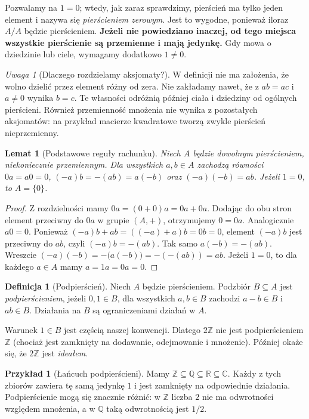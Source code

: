 \documentclass[11pt,a4paper,openany]{report}
\numberwithin{equation}{section}
\theoremstyle{plain}
\newtheorem{lemat}[twierdzenie]{Lemat}
\theoremstyle{definition}
\newtheorem{definicja}[twierdzenie]{Definicja}
\newtheorem{przyklad}[twierdzenie]{Przykład}
\theoremstyle{remark}
\newtheorem{uwaga}[twierdzenie]{Uwaga}
\newcommand{\Z}{\mathbb Z}
\newcommand{\Q}{\mathbb Q}
\newcommand{\R}{\mathbb R}
\newcommand{\C}{\mathbb C}
\begin{document}
Pozwalamy na $1=0$; wtedy, jak zaraz sprawdzimy, pierścień ma tylko jeden
element i nazywa się \emph{pierścieniem zerowym}. Jest to wygodne, ponieważ
iloraz $A/A$ będzie pierścieniem. \textbf{Jeżeli nie powiedziano inaczej,
od tego miejsca wszystkie pierścienie są przemienne i mają jedynkę.}
Gdy mowa o dziedzinie lub ciele, wymagamy dodatkowo $1\ne0$.

\begin{uwaga}[Dlaczego rozdzielamy aksjomaty?]
W definicji nie ma założenia, że wolno dzielić przez element różny od zera.
Nie zakładamy nawet, że z $ab=ac$ i $a\ne0$ wynika $b=c$.
Te własności odróżnią później ciała i dziedziny od ogólnych pierścieni.
Również przemienność mnożenia nie wynika z pozostałych aksjomatów:
na przykład macierze kwadratowe tworzą zwykle pierścień nieprzemienny.
\end{uwaga}

\begin{lemat}[Podstawowe reguły rachunku]
\label{lem:reguly}
Niech $A$ będzie dowolnym pierścieniem, niekoniecznie przemiennym.
Dla wszystkich $a,b\in A$ zachodzą równości
$0a=a0=0$, $(-a)b=-(ab)=a(-b)$ oraz $(-a)(-b)=ab$.
Jeżeli $1=0$, to $A=\{0\}$.
\end{lemat}
\begin{proof}
Z rozdzielności mamy $0a=(0+0)a=0a+0a$.
Dodając do obu stron element przeciwny do $0a$ w grupie $(A,+)$,
otrzymujemy $0=0a$. Analogicznie $a0=0$.
Ponieważ $(-a)b+ab=((-a)+a)b=0b=0$, element $(-a)b$ jest przeciwny
do $ab$, czyli $(-a)b=-(ab)$. Tak samo $a(-b)=-(ab)$.
Wreszcie $(-a)(-b)=-\bigl(a(-b)\bigr)=-(-(ab))=ab$.
Jeżeli $1=0$, to dla każdego $a\in A$ mamy $a=1a=0a=0$.
\end{proof}

\begin{definicja}[Podpierścień]
Niech $A$ będzie pierścieniem. Podzbiór $B\subseteq A$ jest
\emph{podpierścieniem}, jeżeli $0,1\in B$, dla wszystkich $a,b\in B$
zachodzi $a-b\in B$ i $ab\in B$. Działania na $B$ są ograniczeniami
działań w $A$.
\end{definicja}

Warunek $1\in B$ jest częścią naszej konwencji. Dlatego $2\Z$ nie jest
podpierścieniem $\Z$ (chociaż jest zamknięty na dodawanie, odejmowanie
i mnożenie). Później okaże się, że $2\Z$ jest \emph{ideałem}.

\begin{przyklad}[Łańcuch podpierścieni]
Mamy $\Z\subseteq\Q\subseteq\R\subseteq\C$.
Każdy z tych zbiorów zawiera tę samą jedynkę $1$ i jest zamknięty
na odpowiednie działania. Podpierścienie mogą się znacznie różnić:
w $\Z$ liczba $2$ nie ma odwrotności względem mnożenia,
a w $\Q$ taką odwrotnością jest $1/2$.
\end{przyklad}
\end{document}
